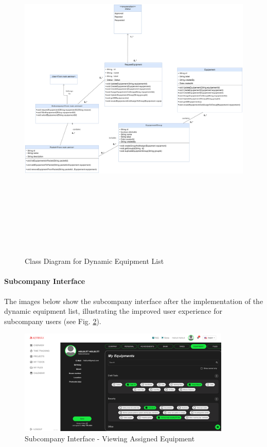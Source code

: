 \begin{figure}[H]
    \centering
    \includegraphics[width=1\textwidth , height=17cm]{src/assets/diagrams/DynamiEquipementListPng.png}
    \caption{Class Diagram for Dynamic Equipment List}
    \label{fig:class_diagram}
\end{figure}
 
\paragraph{Subcompany Interface}
The images below show the subcompany interface after the implementation of the dynamic equipment list, illustrating the improved user experience for subcompany users (see Fig. \ref{fig:subcompany_interface_1}).

\begin{figure}[H]
    \centering
    \includegraphics[width=0.9\textwidth]{src/assets/images/Interface1.png}
    \caption{Subcompany Interface - Viewing Assigned Equipment}
    \label{fig:subcompany_interface_1}
\end{figure}

